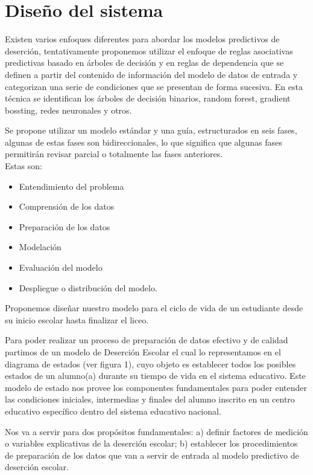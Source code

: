 \documentclass[12pt]{article}
\begin{document}
\section{Diseño del sistema}
Existen varios enfoques diferentes para abordar los modelos predictivos de deserción, tentativamente proponemos utilizar el enfoque de reglas asociativas predictivas basado
en árboles de decisión y en reglas de dependencia que se definen a partir del contenido de información del modelo de datos de entrada y categorizan una serie de condiciones que se presentan de forma sucesiva. En esta técnica se identifican los árboles
de decisión binarios, random forest, gradient bossting, redes neuronales y otros.

Se propone utilizar un modelo estándar y una guía, estructurados en seis fases, algunas de estas fases son bidireccionales, lo que significa que algunas fases permitirán revisar
parcial o totalmente las fases anteriores.\\ Estas son:
\begin{itemize}
\item Entendimiento del problema
\item Comprensión de los datos
\item Preparación de los datos
\item Modelación
\item Evaluación del modelo
\item Despliegue o distribución del modelo.
\end{itemize}

Proponemos diseñar nuestro modelo para el ciclo de vida de un estudiante desde su inicio escolar hasta finalizar el liceo.

Para poder realizar un proceso de preparación de datos efectivo y de calidad partimos de un modelo de Deserción Escolar el cual lo representamos en el diagrama de estados (ver figura 1), cuyo objeto es establecer todos los posibles estados de un alumno(a) durante su tiempo de vida en el sistema educativo. Este modelo de estado nos provee los componentes
fundamentales para poder entender las condiciones iniciales, intermedias y finales del alumno inscrito en un centro educativo específico dentro del sistema educativo nacional. 

Nos va a servir para dos propósitos fundamentales: a) definir factores de medición o variables explicativas de la deserción escolar; b) establecer los procedimientos de preparación de los datos que van a servir de entrada al modelo predictivo de deserción escolar.
\end{document}
